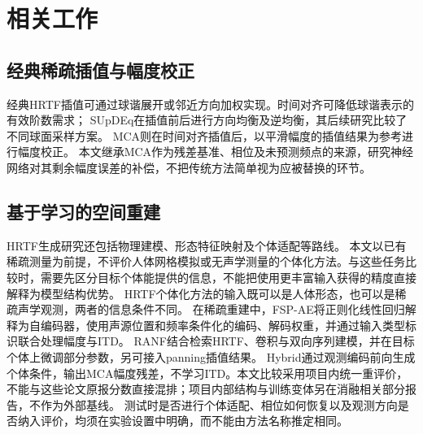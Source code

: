 \section{相关工作}
\label{sec:related}

\subsection{经典稀疏插值与幅度校正}
经典HRTF插值可通过球谐展开或邻近方向加权实现。时间对齐可降低球谐表示的有效阶数需求\cite{R3}；%
SUpDEq在插值前后进行方向均衡及逆均衡，其后续研究比较了不同球面采样方案\cite{R2S}。%
MCA则在时间对齐插值后，以平滑幅度的插值结果为参考进行幅度校正\cite{R1}。%
本文继承MCA作为残差基准、相位及未预测频点的来源，研究神经网络对其剩余幅度误差的补偿，不把传统方法简单视为应被替换的环节。

\subsection{基于学习的空间重建}
HRTF生成研究还包括物理建模、形态特征映射及个体适配等路线\cite{R15}。%
本文以已有稀疏测量为前提，不评价人体网格模拟或无声学测量的个体化方法。与这些任务比较时，需要先区分目标个体能提供的信息，不能把使用更丰富输入获得的精度直接解释为模型结构优势。
HRTF个体化方法的输入既可以是人体形态，也可以是稀疏声学观测，两者的信息条件不同\cite{R16}。%
在稀疏重建中，FSP-AE将正则化线性回归解释为自编码器，使用声源位置和频率条件化的编码、解码权重，并通过输入类型标识联合处理幅度与ITD\cite{R4}。%
RANF结合检索HRTF、卷积与双向序列建模，并在目标个体上微调部分参数，另可接入panning插值结果\cite{R5}。%
Hybrid通过观测编码前向生成个体条件，输出MCA幅度残差，不学习ITD。本文比较采用项目内统一重评价，不能与这些论文原报分数直接混排；项目内部结构与训练变体另在消融相关部分报告，不作为外部基线。
测试时是否进行个体适配、相位如何恢复以及观测方向是否纳入评价，均须在实验设置中明确，而不能由方法名称推定相同。

